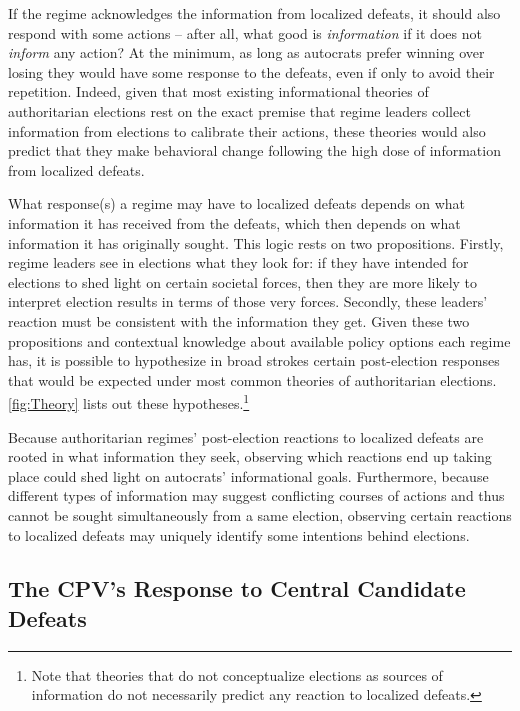 \documentclass[12pt]{article}
\newcommand\fnote[1]{\footnote{\baselineskip=2\normalbaselineskip#1}}
\newcommand{\1}{\mathbbm{1}}
\begin{document}
If the regime acknowledges the information from localized defeats, it should also respond with some actions -- after all, what good is \textit{information} if it does not \textit{inform} any action? At the minimum, as long as autocrats prefer winning over losing they would have some response to the defeats, even if only to avoid their repetition. Indeed, given that most existing informational theories of authoritarian elections rest on the exact premise that regime leaders collect information from elections to calibrate their actions, these theories would also predict that they make behavioral change following the high dose of information from localized defeats. 



What response(s) a regime may have to localized defeats depends on what information it has received from the defeats, which then depends on what information it has originally sought. This logic rests on two propositions. Firstly, regime leaders see in elections what they look for: if they have intended for elections to shed light on certain societal forces, then they are more likely to interpret election results in terms of those very forces. Secondly, these leaders' reaction must be consistent with the information they get. Given these two propositions and contextual knowledge about available policy options each regime has, it is possible to hypothesize in broad strokes certain post-election responses that would be expected under most common theories of authoritarian elections. \autoref{fig:Theory} lists out these hypotheses.\fnote{Note that theories that do not conceptualize elections as sources of information \citep[e.g][]{AR2005, Cox2009} do not necessarily predict any reaction to localized defeats.}

Because authoritarian regimes' post-election reactions to localized defeats are rooted in what information they seek, observing which reactions end up taking place could shed light on autocrats' informational goals. Furthermore, because different types of information may suggest conflicting courses of actions and thus cannot be sought simultaneously from a same election, observing certain reactions to localized defeats may uniquely identify some intentions behind elections. 

\subsection{The CPV's Response to Central Candidate Defeats}
\label{sec:vietnam_local_defeat}
\end{document}
